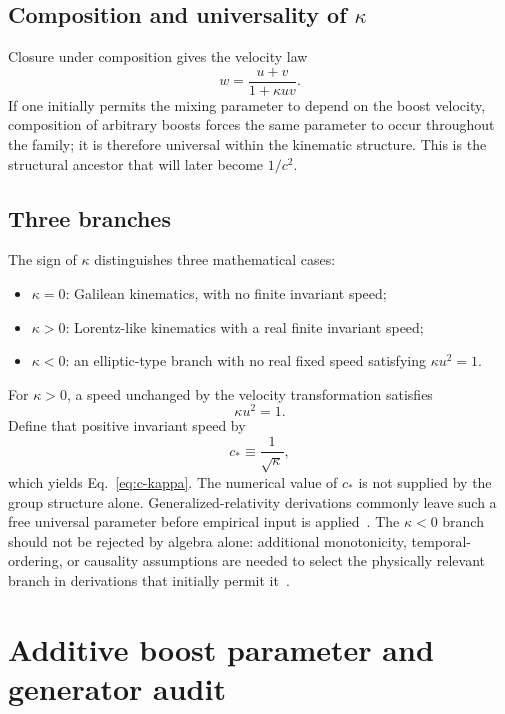 \documentclass[11pt,a4paper]{article}
\newcommand{\kpar}{\kappa}
\newcommand{\cstar}{c_{\!*}}
\begin{document}
\subsection{Composition and universality of \texorpdfstring{$\kpar$}{kappa}}
Closure under composition gives the velocity law
\begin{equation}
w=\frac{u+v}{1+\kpar uv}.
\label{eq:addition}
\end{equation}
If one initially permits the mixing parameter to depend on the boost velocity, composition of arbitrary boosts forces the same parameter to occur throughout the family; it is therefore universal within the kinematic structure. This is the structural ancestor that will later become $1/c^2$.

\subsection{Three branches}
The sign of $\kpar$ distinguishes three mathematical cases:
\begin{itemize}
\item $\kpar=0$: Galilean kinematics, with no finite invariant speed;
\item $\kpar>0$: Lorentz-like kinematics with a real finite invariant speed;
\item $\kpar<0$: an elliptic-type branch with no real fixed speed satisfying $\kpar u^2=1$.
\end{itemize}
For $\kpar>0$, a speed unchanged by the velocity transformation satisfies
\begin{equation}
\kpar u^2=1.
\end{equation}
Define that positive invariant speed by
\begin{equation}
\cstar\equiv\frac{1}{\sqrt{\kpar}},
\end{equation}
which yields Eq.~\eqref{eq:c-kappa}. The numerical value of $\cstar$ is not supplied by the group structure alone. Generalized-relativity derivations commonly leave such a free universal parameter before empirical input is applied~\cite{pal2003,pelissetto2015,drory2014}. The $\kpar<0$ branch should not be rejected by algebra alone: additional monotonicity, temporal-ordering, or causality assumptions are needed to select the physically relevant branch in derivations that initially permit it~\cite{drory2014}.

\section{Additive boost parameter and generator audit}
\end{document}
